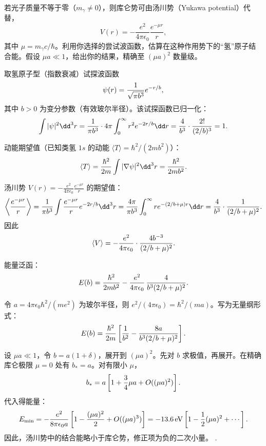 \begin{question}
若光子质量不等于零（$m_\gamma\ne0$），则库仑势可由汤川势（Yukawa potential）代替，
\[
V(r)=-\frac{e^2}{4\pi\epsilon_0}\frac{e^{-\mu r}}{r},
\]
其中 $\mu=m_\gamma c/\hbar$。利用你选择的尝试波函数，估算在这种作用势下的“氢”原子结合能。假设 $\mu a\ll1$，给出你的结果，精确至 $(\mu a)^2$ 数量级。
\end{question}
\begin{solution}
取氢原子型（指数衰减）试探波函数
\[
\psi(r)={1\over\sqrt{\pi b^3}}e^{-r/b},
\]
其中 $b>0$ 为变分参数（有效玻尔半径）。该试探函数已归一化：
\[
\int|\psi|^2\dd^3r={1\over\pi b^3}\cdot4\pi\int_0^\infty r^2 e^{-2r/b}\dd r
={4\over b^3}\cdot{2!\over(2/b)^3}=1.
\]

动能期望值（已知类氢 $1s$ 的动能 $\langle T\rangle=\hbar^2/(2mb^2)$）：
\[
\langle T\rangle={\hbar^2\over2m}\int|\nabla\psi|^2\dd^3r={\hbar^2\over2mb^2}.
\]

汤川势 $V(r)=-\frac{e^2}{4\pi\epsilon_0}\frac{e^{-\mu r}}{r}$ 的期望值：
\[
\left\langle{e^{-\mu r}\over r}\right\rangle
={1\over\pi b^3}\int{e^{-\mu r}\over r}e^{-2r/b}\dd^3r
={4\pi\over\pi b^3}\int_0^\infty r e^{-(2/b+\mu)r}\dd r
={4\over b^3}\cdot{1\over(2/b+\mu)^2}.
\]
因此
\[
\langle V\rangle=-{e^2\over4\pi\epsilon_0}\cdot{4b^{-3}\over(2/b+\mu)^2}.
\]

能量泛函：
\[
E(b)={\hbar^2\over2mb^2}-{e^2\over4\pi\epsilon_0}\,{4\over b^3(2/b+\mu)^2}.
\]

令 $a=4\pi\epsilon_0\hbar^2/(me^2)$ 为玻尔半径，则 $e^2/(4\pi\epsilon_0)=\hbar^2/(ma)$。写为无量纲形式：
\[
E(b)={\hbar^2\over2m}\left[{1\over b^2}-{8a\over b^3(2/b+\mu)^2}\right].
\]

设 $\mu a\ll1$，令 $b=a(1+\delta)$，展开到 $(\mu a)^2$。先对 $b$ 求极值，再展开。在精确库仑极限 $\mu=0$ 处有 $b_*=a$。对有限小 $\mu$，
\[
b_*=a\left[1+{3\over4}\mu a+O((\mu a)^2)\right].
\]
代入得能量：
\[
E_{\min}=-{e^2\over8\pi\epsilon_0 a}\left[1-{(\mu a)^2\over2}+O((\mu a)^3)\right]
=-13.6\,\mathrm{eV}\left[1-{1\over2}(\mu a)^2+\cdots\right].
\]
因此，汤川势中的结合能略小于库仑势，修正项为负的二次小量。
.
\end{solution}

